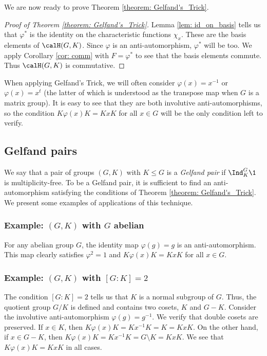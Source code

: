 We are now ready to prove Theorem \ref{theorem: Gelfand's_Trick}.
\begin{proof}[Proof of Theorem \ref{theorem: Gelfand's_Trick}]
    Lemma \ref{lem: id_on_basis} tells us that $\varphi^\ast$ is the identity on the characteristic functions $\chi_x$.
    These are the basis elements of $\calH(G,K)$.
    Since $\varphi$ is an anti-automorphism, $\varphi^\ast$ will be too.
    We apply Corollary \ref{cor: comm} with $F=\varphi^\ast$ to see that the basis elements commute.
    Thus $\calH(G,K)$ is commutative.
\end{proof}
When applying Gelfand's Trick, we will often consider $\varphi(x)=x^{-1}$ or $\varphi(x)=x^t$ (the latter of which is understood as the transpose map when $G$ is a matrix group).
It is easy to see that they are both involutive anti-automorphisms, so the condition $K\varphi(x)K=KxK$ for all $x\in G$ will be the only condition left to verify.


\subsection{Gelfand pairs}\label{Section1.8}
We say that a pair of groups $(G,K)$ with $K\leq G$ is a \emph{Gelfand pair} if $\Ind_K^G \1$ is multiplicity-free.
To be a Gelfand pair, it is sufficient to find an anti-automorphism satisfying the conditions of Theorem \ref{theorem: Gelfand's_Trick}.
We present some examples of applications of this technique.

\subsubsection{Example: $(G,K)$ with $G$ abelian}
For any abelian group $G$, the identity map $\varphi(g)=g$ is an anti-automorphism.
This map clearly satisfies $\varphi^2=1$ and $K\varphi(x)K=KxK$ for all $x\in G$.

\subsubsection{Example: $(G,K)$ with $[G\! :\! K]=2$}
The condition $[G\! :\! K]=2$ tells us that $K$ is a normal subgroup of $G$.
Thus, the quotient group $G/K$ is defined and contains two cosets, $K$ and $G- K$.
Consider the involutive anti-automorphism $\varphi(g)=g^{-1}$.
We verify that double cosets are preserved.
If $x\in K$, then $K\varphi(x)K = Kx^{-1}K = K = KxK$.
On the other hand, if $x\in G- K$, then $K\varphi(x)K = Kx^{-1}K = G\setminus K = KxK$.
We see that $K\varphi(x)K=KxK$ in all cases.

